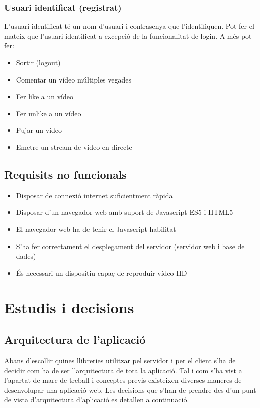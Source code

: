 \documentclass[12pt, titlepage]{article}
\begin{document}
\subsubsection{Usuari identificat (registrat)}
L’usuari identificat té un nom d’usuari i contrasenya que l’identifiquen. Pot fer
el mateix que l’usuari identificat a excepció de la funcionalitat de login. A més
pot fer:

\begin{itemize}
\item Sortir (logout)
\item Comentar un vídeo múltiples vegades
\item Fer like a un vídeo
\item Fer unlike a un vídeo
\item Pujar un vídeo
\item Emetre un stream de vídeo en directe
\end{itemize}

\subsection{Requisits no funcionals}
\begin{itemize}
\item Disposar de connexió internet suficientment ràpida
\item Disposar d’un navegador web amb suport de Javascript ES5 i HTML5
\item El navegador web ha de tenir el Javascript habilitat
\item S’ha fer correctament el desplegament del servidor (servidor web i base de dades)
\item És necessari un dispositiu capaç de reproduir vídeo HD
\end{itemize}


\section{Estudis i decisions}
\subsection{Arquitectura de l’aplicació}
Abans d’escollir quines llibreries utilitzar pel servidor i per el client s’ha de
decidir com ha de ser l’arquitectura de tota la aplicació. Tal i com s’ha vist a
l’apartat de marc de treball i conceptes previs existeixen diverses maneres de
desenvolupar una aplicació web. Les decisions que s’han de prendre des d’un punt
de vista d’arquitectura d’aplicació es detallen a continuació.
\end{document}
